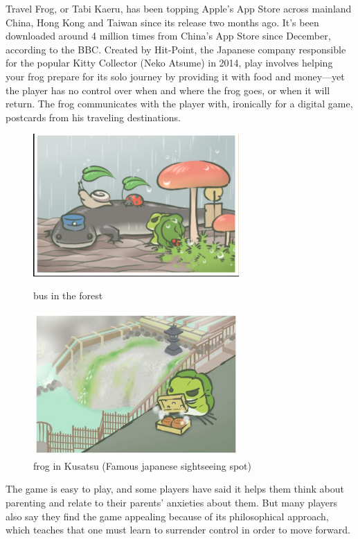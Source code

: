 Travel Frog, or Tabi Kaeru, has been topping Apple’s App Store across mainland China, Hong Kong and Taiwan since its release two months ago. It’s been downloaded around 4 million times from China’s App Store since December, according to the BBC. Created by Hit-Point, the Japanese company responsible for the popular Kitty Collector (Neko Atsume) in 2014, play involves helping your frog prepare for its solo journey by providing it with food and money—yet the player has no control over when and where the frog goes, or when it will return. The frog communicates with the player with, ironically for a digital game, postcards from his traveling destinations.
\begin{figure}[h]
\includegraphics[width=0.7\textwidth]{frog/image/bus.jpg} 
\caption{bus in the forest}
\includegraphics[width=0.7\textwidth]{frog/image/kusatsu.jpg} 
\caption{frog in Kusatsu (Famous japanese sightseeing spot)}
\end{figure}
The game is easy to play, and some players have said it helps them think about parenting and relate to their parents’ anxieties about them. But many players also say they find the game appealing because of its philosophical approach, which teaches that one must learn to surrender control in order to move forward.

